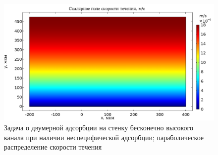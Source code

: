 \documentclass[oneside,final,12pt]{extreport}
\begin{document}
\begin{figure}
  \centering
  \includegraphics[width=.6\textwidth]{pic/flat_wide_twosurf_veldistrib}

  \caption{%
    \label{fig:flat_wide_two_surf_veldistrib}%
    Задача о двумерной адсорбции на стенку бесконечно высокого канала
    при наличии неспецифической адсорбции;
    параболическое распределение скорости течения
  }

\end{figure}
\end{document}
